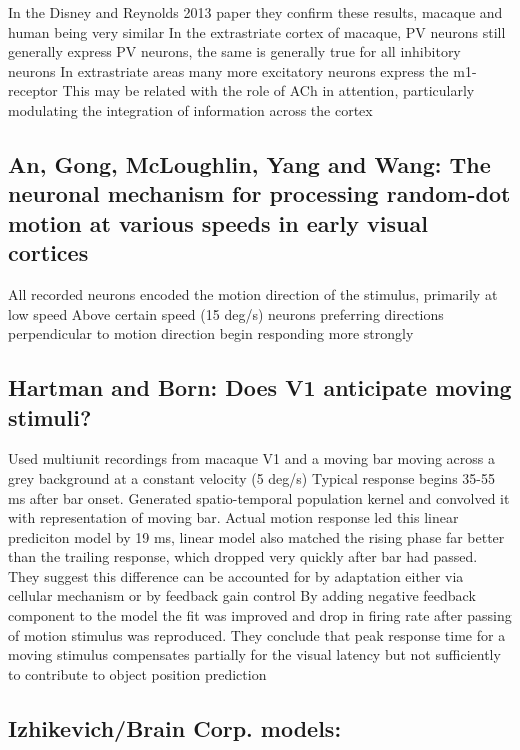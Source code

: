 \documentclass[11pt]{Science}
\begin{document}
In the Disney and Reynolds 2013 paper they confirm these results, macaque and human being very similar
In the extrastriate cortex of macaque, PV neurons still generally express PV neurons, the same is generally true for all inhibitory neurons
In extrastriate areas many more excitatory neurons express the m1-receptor
This may be related with the role of ACh in attention, particularly modulating the integration of information across the cortex

\subsection{An, Gong, McLoughlin, Yang and Wang: The neuronal mechanism for processing random-dot motion at various speeds in early visual cortices}
\label{sec-2.14}


All recorded neurons encoded the motion direction of the stimulus, primarily at low speed
Above certain speed (15 deg/s) neurons preferring directions perpendicular to motion direction begin responding more strongly

\subsection{Hartman and Born: Does V1 anticipate moving stimuli?}
\label{sec-2.15}


Used multiunit recordings from macaque V1 and a moving bar moving across a grey background at a constant velocity (5 deg/s)
Typical response begins 35-55 ms after bar onset.
Generated spatio-temporal population kernel and convolved it with representation of moving bar.
Actual motion response led this linear prediciton model by 19 ms, linear model also matched the rising phase far better than the trailing response, which dropped very quickly after bar had passed.
They suggest this difference can be accounted for by adaptation either via cellular mechanism or by feedback gain control
By adding negative feedback component to the model the fit was improved and drop in firing rate after passing of motion stimulus was reproduced.
They conclude that peak response time for a moving stimulus compensates partially for the visual latency but not sufficiently to contribute to object position prediction

\subsection{Izhikevich/Brain Corp. models:}
\label{sec-2.16}
\end{document}
